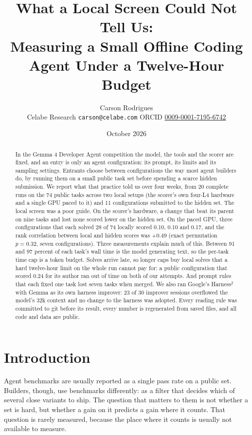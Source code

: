\documentclass[11pt]{article}
\title{What a Local Screen Could Not Tell Us:\\Measuring a Small Offline Coding Agent Under a Twelve-Hour Budget}
\author{Carson Rodrigues\\[2pt]
\small Celabe Research \quad \texttt{carson@celabe.com} \quad ORCID \href{https://orcid.org/0009-0001-7195-6742}{0009-0001-7195-6742}}
\date{October 2026}
\begin{document}
\maketitle

\begin{abstract}
In the Gemma 4 Developer Agent competition the model, the tools and the scorer are fixed, and an entry is only an agent
configuration: its prompt, its limits and its sampling settings. Entrants choose between configurations the way most agent
builders do, by running them on a small public task set before spending a scarce hidden submission. We report what that
practice told us over four weeks, from 20 complete runs on the 74 public tasks across two local setups (the scorer's own
four-L4 hardware and a single GPU paced to it) and 11 configurations submitted to the hidden set. The local screen was a poor guide.
On the scorer's hardware, a change that beat its parent on nine tasks and lost none scored lower on the hidden set. On the
paced GPU, three configurations that each solved 28 of 74 locally scored 0.10, 0.10 and 0.17, and the rank correlation
between local and hidden scores was $+0.49$ (exact permutation $p=0.32$, seven configurations). Three measurements explain
much of this. Between 91 and 97 percent of each task's wall time is the model generating text, so the per-task time cap is a
token budget. Solves arrive late, so longer caps buy local solves that a hard twelve-hour limit on the whole run cannot pay
for: a public configuration that scored 0.24 for its author ran out of time on both of our attempts. And prompt rules that each
fixed one task lost seven tasks when merged. We also ran Google's Harness$^2$ with Gemma as its own harness improver: 23 of 30
improver sessions overflowed the model's 32k context and no change to the harness was adopted. Every reading rule was committed to
git before its result, every number is regenerated from saved files, and all code and data are public.
\end{abstract}

\section{Introduction}

Agent benchmarks are usually reported as a single pass rate on a public set. Builders, though, use benchmarks differently: as
a filter that decides which of several close variants to ship. The question that matters to them is not whether a set is
hard, but whether a gain on it predicts a gain where it counts. That question is rarely measured, because the place where it
counts is usually not available to measure.
\end{document}
